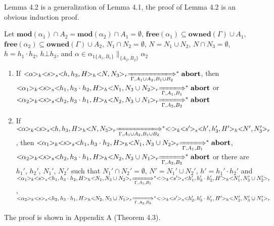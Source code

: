 \documentclass{lmcs} %
\theoremstyle{plain}\newtheorem{satz}[thm]{Satz} %
\begin{document}
Lemma 4.2 is a generalization of Lemma 4.1, the proof of Lemma 4.2 is an obvious induction proof.
\begin{thm}
Let $\mathbf{mod}(\alpha_1)\cap A_2=\mathbf{mod}(\alpha_2)\cap A_1=\emptyset$, $\mathbf{free}(\alpha_1)\subseteq \mathbf{owned}(\Gamma)\cup A_1$, $\mathbf{free}(\alpha_2)\subseteq \mathbf{owned}(\Gamma)\cup A_2$, $N_1 \cap N_2=\emptyset$, $N=N_1 \cup N_2$, $N \cap N_3=\emptyset$, $h=h_1\cdot h_2$, $h\bot h_3$, and $\alpha\in \alpha_{1\{A_1,B_1\}}\|_{\{A_2,B_2\}}\alpha_2$
\begin{enumerate}
  \item If $<\!\!\alpha\!\!>_k<\!\!s\!\!>_s<\!\!h,h_3,H\!\!>_h<\!\!N,N_3\!\!>_r\xLongrightarrow[\Gamma, A_1\cup A_2, B_1\cup B_2]{}^*\mathbf{abort}$, then $<\!\!\alpha_1\!\!>_k<\!\!s\!\!>_s<\!\!h_1,h_3\cdot h_2,H\!\!>_h<\!\!N_1,N_3\cup N_2\!\!>_r\xLongrightarrow[\Gamma, A_1,B_1]{}^*\mathbf{abort}$ or $<\!\!\alpha_2\!\!>_k<\!\!s\!\!>_s<\!\!h_2,h_3\cdot h_1,H\!\!>_h<\!\!N_2,N_3\cup N_1\!\!>_r\xLongrightarrow[\Gamma, A_2, B_2]{}^*\mathbf{abort}$
  \item If $<\!\!\alpha\!\!>_k<\!\!s\!\!>_s<\!\!h,h_3,H\!\!>_h<\!\!N,N_3\!\!>_r\xLongrightarrow[\Gamma, A_1\cup A_2, B_1\cup B_2]{}^*<\!\!\cdot\!\!>_k<\!\!s'\!\!>_s<\!\!h',h_3',H'\!\!>_h<\!\!N',N_3'\!\!>_r$, then $<\!\!\alpha_1\!\!>_k<\!\!s\!\!>_s<\!\!h_1,h_3\cdot h_2,H\!\!>_h<\!\!N_1,N_3\cup N_2\!\!>_r\xLongrightarrow[\Gamma, A_1, B_1]{}^*\mathbf{abort}$, $<\!\!\alpha_2\!\!>_k<\!\!s\!\!>_s<\!\!h_2,h_3\cdot h_1,H\!\!>_h<\!\!N_2,N_3\cup N_1\!\!>_r\xLongrightarrow[\Gamma, A_2, B_2]{}^*\mathbf{abort}$ or there are $h_1'$, $h_2'$, $N_1'$, $N_2'$ such that $N_1'\cap N_2'=\emptyset$, $N'=N_1'\cup N_2'$, $h'=h_1'\cdot h_2'$ and
      $<\!\!\alpha_1\!\!>_k<\!\!s\!\!>_s<\!\!h_1,h_3\cdot h_2,H\!\!>_h<\!\!N_1,N_3\cup N_2\!\!>_r\xLongrightarrow[\Gamma, A_1, B_1]{}^*<\!\!\cdot\!\!>_k<\!\!s'\!\!>_s<\!\!h_1',h_3'\cdot h_2',H'\!\!>_h<\!\!N_1',N_3'\cup N_2'\!\!>_r$, $<\!\!\alpha_2\!\!>_k<\!\!s\!\!>_s<\!\!h_2,h_3\cdot h_1,H\!\!>_h<\!\!N_2,N_3\cup N_1\!\!>_r\xLongrightarrow[\Gamma, A_2, B_2]{}^*<\!\!\cdot\!\!>_k<\!\!s'\!\!>_s<\!\!h_2',h_3'\cdot h_1',H'\!\!>_h<\!\!N_2',N_3'\cup N_1'\!\!>_r$
\end{enumerate}
\end{thm}
The proof is shown in Appendix A (Theorem 4.3).
\end{document}

